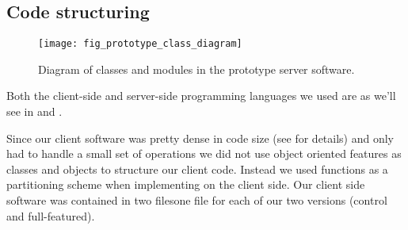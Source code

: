 \subsection{Code structuring}
\label{section:implementation.architecture.code.structuring}

\begin{figure}
  \begin{whole}
    \texttt{[image: fig\_prototype\_class\_diagram]}
    \caption[Prototype Class Diagram]{
      Diagram of classes and modules in the prototype server software.
    }
    \label{figure:fig.prototype.class.diagram}
  \end{whole}
\end{figure}

Both the client-side and server-side programming languages we used
are as we'll see in
 and
 .%

Since our client software was pretty dense in code size (see
 for details) and only had to handle
a small set of operations we did not use object oriented
features as classes and objects to structure our client code. Instead we used
functions as a partitioning scheme when implementing on the client side.
Our client side software was contained in two files\dash{}one file for each
of our two versions (control and full-featured).

